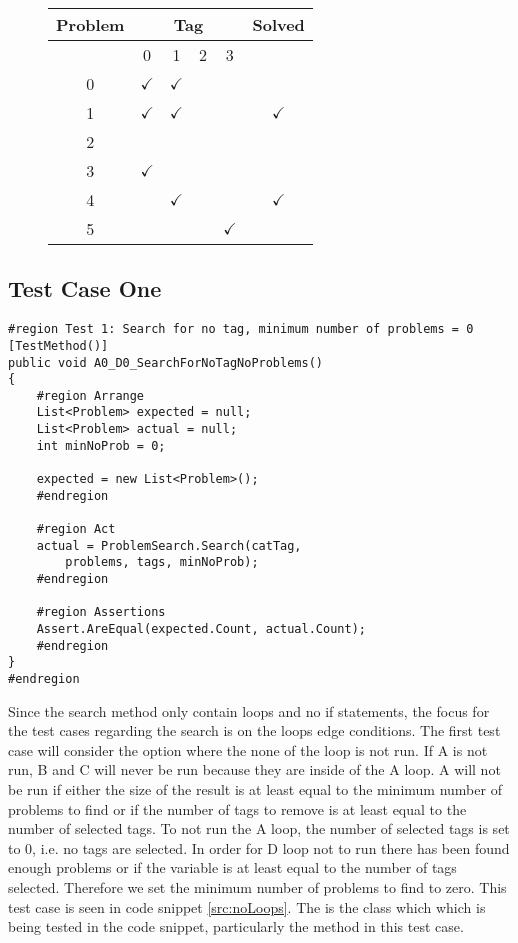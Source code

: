\begin{figure}[H]
	\centering
		\begin{tabular}{|c|c|c|c|c|c|}
		\hline
			Problem	& \multicolumn{4}{c|}{Tag} & Solved \\ \hline
								& 0&1&2&3& \\ \hline
			0					& $\checkmark$ & $\checkmark$ & & & \\ \hline
			1					& $\checkmark$ & $\checkmark$ & & & $\checkmark$  \\ \hline
			2					& & & & & \\ \hline
			3					& $\checkmark$& & & & \\ \hline
			4					& & $\checkmark$& & & $\checkmark$ \\ \hline
			5					& & & & $\checkmark$ & \\ \hline
		\end{tabular}
	\label{tab:problem_search_base}
\end{figure}


\subsection{Test Case One}
\begin{lstlisting}[style=sourceCode, caption=\myCaption{The test case for no run of any loops}, label=src:noLoops]
#region Test 1: Search for no tag, minimum number of problems = 0
[TestMethod()]
public void A0_D0_SearchForNoTagNoProblems()
{
	#region Arrange
	List<Problem> expected = null;
	List<Problem> actual = null;
	int minNoProb = 0;

	expected = new List<Problem>();
	#endregion

	#region Act
	actual = ProblemSearch.Search(catTag,
		problems, tags, minNoProb);
	#endregion

	#region Assertions
	Assert.AreEqual(expected.Count, actual.Count);
	#endregion
}
#endregion
\end{lstlisting}

Since the search method only contain loops and no if statements, the focus for the test cases regarding the search is on the loops edge conditions.
The first test case will consider the option where the none of the loop is not run.
If A is not run, B and C will never be run because they are inside of the A loop.
A will not be run if either the size of the result is at least equal to the minimum number of problems to find or if the number of tags to remove is at least equal to the number of selected tags.
To not run the A loop, the number of selected tags is set to 0, i.e. no tags are selected.
In order for D loop not to run there has been found enough problems or if the  variable is at least equal to the number of tags selected. Therefore we set the minimum number of problems to find to zero.
This test case is seen in code snippet \ref{src:noLoops}.
The  is the class which which is being tested in the code snippet, particularly the  method in this test case.

